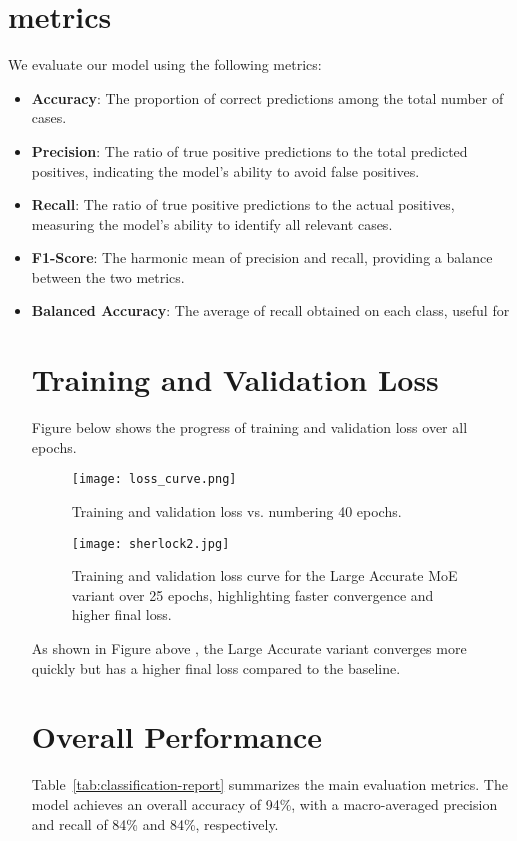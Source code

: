 \section{metrics}
We evaluate our model using the following metrics:
\begin{itemize}
  \item \textbf{Accuracy}: The proportion of correct predictions among the total number of cases.
  \item \textbf{Precision}: The ratio of true positive predictions to the total predicted positives, indicating the model's ability to avoid false positives.
  \item \textbf{Recall}: The ratio of true positive predictions to the actual positives, measuring the model's ability to identify all relevant cases.
  \item \textbf{F1-Score}: The harmonic mean of precision and recall, providing a balance between the two metrics.
  \item \textbf{Balanced Accuracy}: The average of recall obtained on each class, useful for
\section{Training and Validation Loss}
Figure below shows the progress of training and validation loss over all epochs.

\begin{figure}[H]
  \centering
  \texttt{[image: loss\_curve.png]}
  \caption{Training and validation loss vs.
numbering 40 epochs.}
  \label{fig:loss-curve}
\end{figure}

\begin{figure}[H]
  \centering
  \texttt{[image: sherlock2.jpg]}
  \caption{Training and validation loss curve for the Large Accurate MoE variant over 25 epochs, highlighting faster convergence and higher final loss.}
  \label{fig:large-model-loss}
\end{figure}
As shown in Figure above , the Large Accurate variant converges more quickly but has a higher final loss compared to the baseline.

\section{Overall Performance}
Table~\ref{tab:classification-report} summarizes the main evaluation metrics. The model achieves an overall accuracy of 94\%, with a macro-averaged precision and recall of 84\% and 84\%, respectively.


\end{itemize}
